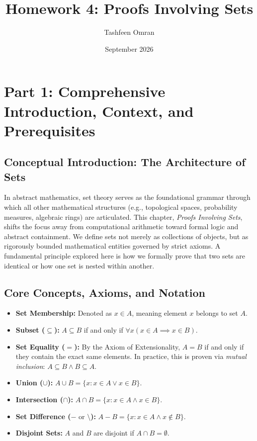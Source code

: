 \documentclass[11pt]{article}
\title{\textbf{Homework 4: Proofs Involving Sets}}
\author{Tashfeen Omran}
\date{September 2026}
\begin{document}
\maketitle
\tableofcontents
\newpage

\section{Part 1: Comprehensive Introduction, Context, and Prerequisites}

\subsection{Conceptual Introduction: The Architecture of Sets}
In abstract mathematics, set theory serves as the foundational grammar through which all other mathematical structures (e.g., topological spaces, probability measures, algebraic rings) are articulated. This chapter, \textit{Proofs Involving Sets}, shifts the focus away from computational arithmetic toward formal logic and abstract containment. We define sets not merely as collections of objects, but as rigorously bounded mathematical entities governed by strict axioms. A fundamental principle explored here is how we formally prove that two sets are identical or how one set is nested within another.

\subsection{Core Concepts, Axioms, and Notation}
\begin{itemize}
    \item \textbf{Set Membership:} Denoted as $x \in A$, meaning element $x$ belongs to set $A$.
    \item \textbf{Subset ($\subseteq$):} $A \subseteq B$ if and only if $\forall x (x \in A \implies x \in B)$.
    \item \textbf{Set Equality ($=$):} By the Axiom of Extensionality, $A = B$ if and only if they contain the exact same elements. In practice, this is proven via \textit{mutual inclusion}: $A \subseteq B \land B \subseteq A$.
    \item \textbf{Union ($\cup$):} $A \cup B = \{x : x \in A \lor x \in B\}$.
    \item \textbf{Intersection ($\cap$):} $A \cap B = \{x : x \in A \land x \in B\}$.
    \item \textbf{Set Difference ($- \text{ or } \setminus$):} $A - B = \{x : x \in A \land x \notin B\}$.
    \item \textbf{Disjoint Sets:} $A$ and $B$ are disjoint if $A \cap B = \emptyset$.
\end{itemize}
\end{document}
